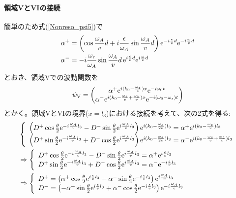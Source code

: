 \paragraph{領域VとVIの接続}簡単のため式(\ref{Nonreso_psi5})で
\begin{align}
\alpha^+ &= \left(\cos \frac{\omega_A}{v}d +i\frac{\epsilon}{\omega_A} \sin \frac{\omega_A}{v}d\right) \mathrm{e}^{-i\frac{\epsilon}{v} d} \mathrm{e}^{-i\frac{\omega}{v} d} \label{Nonreso_alpha+}\\
\alpha^-&=-i \frac{\omega_r}{\omega_A} \sin \frac{\omega_A}{v}d  \, \mathrm{e}^{i\frac{\epsilon}{v}d} \mathrm{e}^{i\frac{\omega}{v} d} \label{Nonreso_alpha-}
\end{align}
とおき、領域Vでの波動関数を
\begin{equation}
\psi_\mathrm{V} =\begin{pmatrix} \alpha^+ \mathrm{e}^{i(k_0-\frac{\omega_z}{v})x}\mathrm{e}^{-i\omega_0t}\\ \alpha^- \mathrm{e}^{i(k_0-\frac{\omega_s}{v}+\frac{\omega_z}{v})x}\mathrm{e}^{-i(\omega_0-\omega_s)t} \end{pmatrix}
\end{equation}
とかく。領域VとVIの境界($x=l_3$)における接続を考えて、次の2式を得る:
\begin{align}
&\left\{\begin{array}{l} \left(D^+ \cos\frac{\theta}{2} \mathrm{e}^{-i\frac{\omega_A}{v} l_3}-D^-\sin\frac{\theta}{2} \mathrm{e}^{i\frac{\omega_A}{v}l_3}\right) \mathrm{e}^{i(k_0-\frac{\omega_s}{2v})l_3} =\alpha^+ \mathrm{e}^{i(k_0-\frac{\omega_z}{v})l_3} \\ \left(D^+\sin\frac{\theta}{2}\mathrm{e}^{-i\frac{\omega_A}{v} l_3}+D^-\cos\frac{\theta}{2}\mathrm{e}^{i\frac{\omega_A}{v} l_3}\right) \mathrm{e}^{i(k_0-\frac{\omega_s}{2v})l_3} =\alpha^- \mathrm{e}^{i(k_0-\frac{\omega_s}{v}+\frac{\omega_z}{v})l_3}\end{array} \right. \notag \\
&\Rightarrow \left\{\begin{array}{l} D^+ \cos\frac{\theta}{2} \mathrm{e}^{-i\frac{\omega_A}{v} l_3}-D^-\sin\frac{\theta}{2} \mathrm{e}^{i\frac{\omega_A}{v}l_3} =\alpha^+ \mathrm{e}^{i\frac{\epsilon}{v}l_3} \\ D^+\sin\frac{\theta}{2}\mathrm{e}^{-i\frac{\omega_A}{v} l_3}+D^-\cos\frac{\theta}{2}\mathrm{e}^{i\frac{\omega_A}{v} l_3} =\alpha^- \mathrm{e}^{-i\frac{\epsilon}{v}l_3}\end{array} \right. \notag \\
&\Rightarrow \left\{\begin{array}{l} D^+ =\left(\alpha^+ \cos\frac{\theta}{2}\mathrm{e}^{i\frac{\epsilon}{v}l_3} +\alpha^- \sin\frac{\theta}{2}\mathrm{e}^{-i\frac{\epsilon}{v}l_3}\right) \mathrm{e}^{i\frac{\omega_A}{v} l_3} \\ D^-=\left(-\alpha^+ \sin\frac{\theta}{2} \mathrm{e}^{i\frac{\epsilon}{v}l_3} +\alpha^-\cos\frac{\theta}{2}\mathrm{e}^{-i\frac{\epsilon}{v}l_3} \right)\mathrm{e}^{-i\frac{\omega_A}{v} l_3} \end{array} \right.
\end{align}
